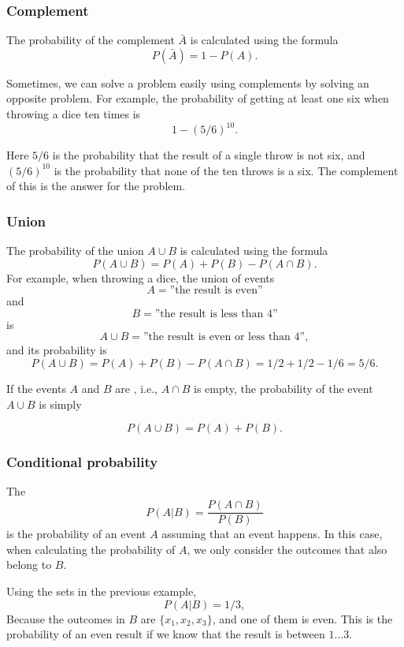 \subsubsection{Complement}

The probability of the complement
$\bar A$ is calculated using the formula
\[P(\bar A)=1-P(A).\]

Sometimes, we can solve a problem easily
using complements by solving an opposite problem.
For example, the probability of getting
at least one six when throwing a dice ten times is
\[1-(5/6)^{10}.\]

Here $5/6$ is the probability that the result
of a single throw is not six, and
$(5/6)^{10}$ is the probability that none of
the ten throws is a six.
The complement of this is the answer for the problem.

\subsubsection{Union}

The probability of the union $A \cup B$
is calculated using the formula
\[P(A \cup B)=P(A)+P(B)-P(A \cap B).\]
For example, when throwing a dice,
the union of events
\[A=\textrm{''the result is even''}\]
and
\[B=\textrm{''the result is less than 4''}\]
is
\[A \cup B=\textrm{''the result is even or less than 4''},\]
and its probability is
\[P(A \cup B) = P(A)+P(B)-P(A \cap B)=1/2+1/2-1/6=5/6.\]

If the events $A$ and $B$ are , i.e.,
$A \cap B$ is empty,
the probability of the event $A \cup B$ is simply

\[P(A \cup B)=P(A)+P(B).\]

\subsubsection{Conditional probability}


The 
\[P(A | B) = \frac{P(A \cap B)}{P(B)}\]
is the probability of an event $A$
assuming that an event happens.
In this case, when calculating the
probability of $A$, we only consider the outcomes
that also belong to $B$.

Using the sets in the previous example,
\[P(A | B)= 1/3,\]
Because the outcomes in $B$ are
$\{x_1,x_2,x_3\}$, and one of them is even.
This is the probability of an even result
if we know that the result is between $1 \ldots 3$.


